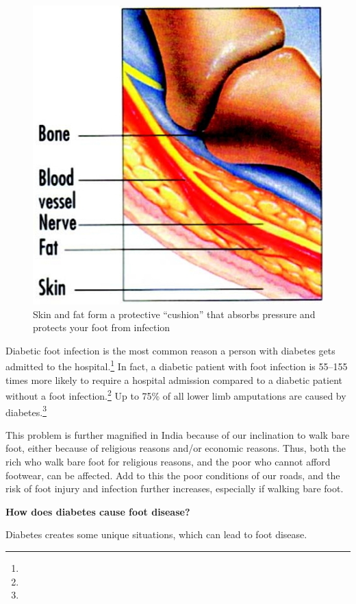 \begin{figure}
\caption{Skin and fat form a protective “cushion” that absorbs pressure and protects your foot from infection}
\includegraphics{images/056.jpg}
\end{figure}

Diabetic foot infection is the most common reason a person with diabetes gets admitted to the hospital.\footnote{} In fact, a diabetic patient with foot infection is 55–155 times more likely to require a hospital admission compared to a diabetic patient without a foot infection.\footnote{} Up to 75\% of all lower limb amputations are caused by diabetes.\footnote{}

This problem is further magnified in India because of our inclination to walk bare foot, either because of religious reasons and/or economic reasons. Thus, both the rich who walk bare foot for religious reasons, and the poor who cannot afford footwear, can be affected. Add to this the poor conditions of our roads, and the risk of foot injury and infection further increases, especially if walking bare foot.

\textbf{How does diabetes cause foot disease?}

Diabetes creates some unique situations, which can lead to foot disease.


